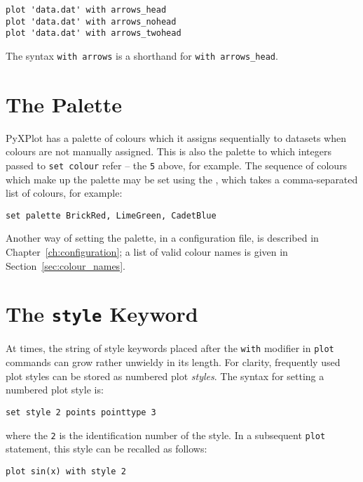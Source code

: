 \begin{verbatim}
plot 'data.dat' with arrows_head
plot 'data.dat' with arrows_nohead
plot 'data.dat' with arrows_twohead
\end{verbatim}

The syntax {\tt with arrows} is a shorthand for {\tt with arrows\_head}.

\section{The Palette}
\label{sec:palette}

 PyXPlot has a palette of
colours which it assigns sequentially to datasets when colours are not manually
assigned. This is also the palette to which integers passed to {\tt set colour}
refer -- the {\tt 5} above, for example. The sequence of colours which make up
the palette may be set using the , which takes a
comma-separated list of colours, for example:

\begin{verbatim}
set palette BrickRed, LimeGreen, CadetBlue
\end{verbatim}

\noindent Another way of setting the palette, in a configuration file, is
described in Chapter~\ref{ch:configuration}; a list of valid colour names is
given in Section~\ref{sec:colour_names}.

\section{The {\tt style} Keyword}

At times, the string of style keywords placed after the {\tt with} modifier in
{\tt plot} commands can grow rather unwieldy in its length. For clarity,
frequently used plot styles can be stored as numbered plot {\it styles}.  The
syntax for setting a numbered plot style is:

\begin{verbatim}
set style 2 points pointtype 3
\end{verbatim}

\noindent where the {\tt 2} is the identification number of the style. In a
subsequent {\tt plot} statement, this style can be recalled as follows:

\begin{verbatim}
plot sin(x) with style 2
\end{verbatim}

